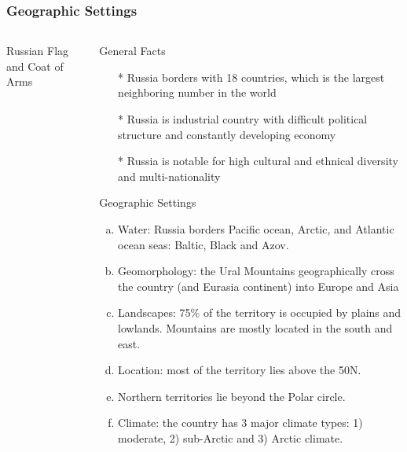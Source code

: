 \documentclass[pdflatex,compress,8pt,
	xcolor={dvipsnames,dvipsnames,svgnames,x11names,table},
	hyperref={colorlinks = true,breaklinks = true, urlcolor = NavyBlue, breaklinks = true}]{beamer}
\begin{document}
\begin{frame}\frametitle{Geographic Settings}
\begin{minipage}[0.4\textheight]{\textwidth}
\begin{columns}[T]
\begin{column}{0.2\textwidth}
\begin{figure}[H]
	\centering
			\vspace{5mm}
\end{figure}
\small{Russian Flag and Coat of Arms}
\end{column}
\begin{column}{0.8\textwidth}
General Facts
 \begin{itemize}
	\item [*]Russia borders with 18 countries, which is the largest neighboring number in the world
	\item [*]Russia is industrial country with difficult political structure and constantly developing economy
	\item [*]Russia is notable for high cultural and ethnical diversity and multi-nationality
\end{itemize}
Geographic Settings
\begin{enumerate}[(a)]
	\item Water: Russia borders Pacific ocean, Arctic, and Atlantic ocean seas: Baltic, Black and Azov.
	\item Geomorphology: the Ural Mountains geographically cross the country (and Eurasia continent) into Europe and Asia 
	\item Landscapes: 75\% of the territory is occupied by plains and lowlands. Mountains are mostly located in the south and east.
	\item Location: most of the territory lies above the 50\degree N. 
	\item Northern territories lie beyond the Polar circle. 
	\item Climate: the country has 3 major climate types: 1) moderate, 2) sub-Arctic and 3) Arctic climate. 
\end{enumerate}
\end{column}
\end{columns}
\end{minipage}
\end{frame}
\end{document}
